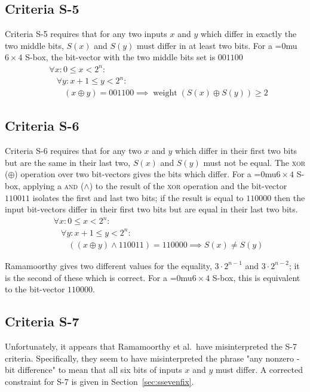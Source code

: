 \documentclass[a4paper,10pt,twoside,openright]{book}
\renewcommand{\sc}[1]{\textsc{\lowercase{#1}}}
\renewcommand{\ln}[1]{{\fontsize{8pt}{8pt}\selectfont#1}}
\newcommand*\sixbyfour{\begingroup\medmuskip=0mu\relax$6 \times 4$\endgroup}
\DeclareMathOperator{\weight}{weight}
\begin{document}
\subsection{Criteria S-5}
\label{sec:sfive}
Criteria S-5 requires that for any two inputs $x$ and $y$ which differ in exactly the two middle bits, $S(x)$ and $S(y)$ must differ in at least two bits. For a \sixbyfour{} S-box, the bit-vector with the two middle bits set is $001100$ 
\begin{align*}
    & \forall x : 0 \leq x < 2^n :\\
    & ~~~~ \forall y : x+1 \leq y < 2^n : \\
    & ~~~~~~~~ (x \oplus y) = 001100
    \implies
    \weight(S(x) \oplus S(y)) \geq 2
\end{align*}

\subsection{Criteria S-6}
\label{sec:ssix}
Criteria S-6 requires that for any two $x$ and $y$ which differ in their first two bits but are the same in their last two, $S(x)$ and $S(y)$ must not be equal. 
The \sc{xor} ($\oplus$) operation over two bit-vectors gives the bits which differ. 
For a \sixbyfour{} S-box, applying a \sc{and} ($\land$) to 
the result of the \sc{xor} operation 
and the bit-vector $110011$ 
isolates the first and last two bits; if the result is equal to $110000$ then the input bit-vectors differ in their first two bits but are equal in their last two bits.
\begin{align*}
    & \forall x : 0 \leq x < 2^n : \\
    & ~~~~ \forall y : x+1 \leq y < 2^n : \\
    & ~~~~~~~~ \left(\left(x \oplus y\right) \land 110011\right) = 110000 
    \implies
    S(x) \neq S(y)
\end{align*}

Ramamoorthy gives two different values for the equality, $3 \cdot 2^{n-1}$ and $3 \cdot 2^{n-2}$; it is the second of these which is correct. For a \sixbyfour{} S-box, this is equivalent to the bit-vector $110000$.

\subsection{Criteria S-7}

Unfortunately, it appears that Ramamoorthy et al.\ have misinterpreted the S-7 criteria. Specifically, they seem to have misinterpreted the phrase "any nonzero \ln{6}-bit difference" to mean that all six bits of inputs $x$ and $y$ must differ. A corrected constraint for S-7 is given in Section~\ref{sec:ssevenfix}.
\end{document}
